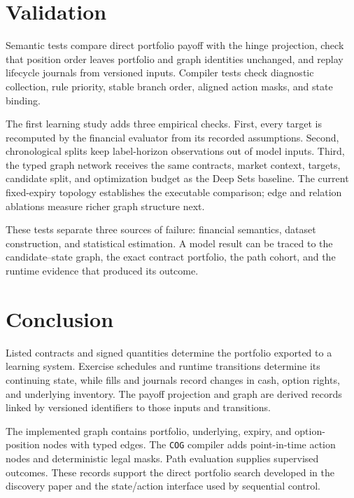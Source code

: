 \documentclass{strategynet-journal}
\newcommand{\COG}{\texttt{COG}}
\begin{document}
\begin{SNcolumns}

\section{Validation}

Semantic tests compare direct portfolio payoff with the hinge projection,
check that position order leaves portfolio and graph identities unchanged,
and replay lifecycle journals from versioned inputs.  Compiler tests check
diagnostic collection, rule priority, stable branch order, aligned action
masks, and state binding.

The first learning study adds three empirical checks.  First, every target is
recomputed by the financial evaluator from its recorded assumptions.  Second,
chronological splits keep label-horizon observations out of model inputs.
Third, the typed graph network receives the same contracts, market context,
targets, candidate split, and optimization budget as the Deep Sets baseline.
The current fixed-expiry topology establishes the executable comparison;
edge and relation ablations measure richer graph structure next.

These tests separate three sources of failure: financial semantics, dataset
construction, and statistical estimation.  A model result can be traced to
the candidate--state graph, the exact contract portfolio, the path cohort,
and the runtime evidence that produced its outcome.

\section{Conclusion}

Listed contracts and signed quantities determine the portfolio exported to a
learning system.  Exercise schedules and runtime transitions determine its
continuing state, while fills and journals record changes in cash, option
rights, and underlying inventory.  The payoff projection and graph are
derived records linked by versioned identifiers to those inputs and
transitions.

The implemented graph contains portfolio, underlying, expiry, and
option-position nodes with typed edges.  The \COG{} compiler adds
point-in-time action nodes and deterministic legal masks.  Path evaluation
supplies supervised outcomes.  These records support the direct portfolio
search developed in the discovery paper and the state/action interface used
by sequential control.

\end{SNcolumns}
\end{document}
